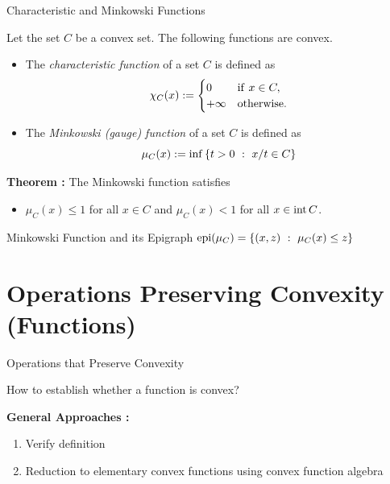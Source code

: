 \documentclass[9pt]{beamer}
\begin{document}
\begin{frame}{Characteristic and Minkowski Functions}

  Let the set $C$ be a convex set. The following functions are convex.

  \begin{itemize}
  \item The \emph{characteristic function} of a set $C$ is defined as
    \[
      \chi_{C}(x) := \begin{cases} 0 & \mathrm{if}~x\in C, \\ +\infty & \mathrm{otherwise}. \end{cases}
    \]
    \vspace{2em}
  \item The \emph{Minkowski (gauge) function} of a set $C$ is defined as
    \[
      \mu_{C}(x) := \inf\left\{ t>0\ : \ x/t\in C \right\}
    \]
  \end{itemize}

  
  \vfill
  
  \textbf{Theorem :} The Minkowski function satisfies
  \begin{itemize}
  \item $\mu_C(x) \leq 1$ for all $x\in C$ and $\mu_C(x) < 1$ for all $x \in \operatorname{int} C$.
  \end{itemize}
  
\end{frame}

\begin{frame}{Minkowski Function and its Epigraph $\operatorname{epi}(\mu_C)=\left\{ (x, z)\ : \ \mu_C(x)\leq z \right\}$}

  \centering
  

\end{frame}


\section{Operations Preserving Convexity (Functions)}

\begin{frame}{Operations that Preserve Convexity}

  How to establish whether a function is convex?

  \vfill

  \textbf{General Approaches :}
  \begin{enumerate}
  \item Verify definition
  \item Reduction to elementary convex functions using convex function algebra
  \end{enumerate}

\end{frame}
\end{document}
